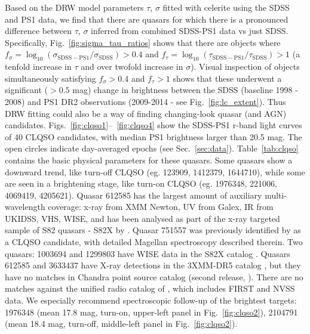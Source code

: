 \documentclass[twocolumn]{aastex62}
\newcommand{\project}[1]{\textsf{#1}}
\begin{document}
Based on the DRW model  parameters $\tau$, $\sigma$ fitted with \project{celerite} using the SDSS and PS1 data, we find that there are quasars for which there is a pronounced difference between $\tau$, $\sigma$  inferred from combined SDSS-PS1 data vs just SDSS. Specifically, Fig.~\ref{fig:sigma_tau_ratios} shows that there are objects where $f_{\sigma} = \log_{10}{\left( \sigma_{\mathrm{SDSS-PS1}} / \sigma_{\mathrm{SDSS}} \right)} > 0.4 $ and $f_{\tau} = \log_{10}{\left( \tau_{\mathrm{SDSS-PS1}} / \tau_{\mathrm{SDSS}} \right)} > 1$ (a tenfold increase in $\tau$ and over twofold increase in $\sigma$). Visual inspection of objects simultaneously satisfying $f_{\sigma}> 0.4$ and $f_{\tau}> 1 $ shows that these underwent a significant ($>0.5$ mag) change in brightness between the SDSS (baseline 1998 - 2008) and PS1 DR2 observations (2009-2014 - see Fig.~\ref{fig:lc_extent}). Thus DRW fitting could also be a way of finding changing-look quasar (and AGN) candidates. Figs.~\ref{fig:clqso1}--~\ref{fig:clqso4} show the SDSS-PS1 r-band light curves of 40 CLQSO candidates, with median PS1 brightness larger  than 20.5 mag. The open circles indicate day-averaged epochs (see Sec.~\ref{sec:data}). Table~\ref{tab:clqso} contains the basic physical parameters for these quasars. Some quasars show a downward trend, like turn-off CLQSO (eg. 123909, 1412379,  1644710), while some are seen in a brightening stage, like turn-on CLQSO (eg. 1976348, 221006, 4069419, 4205621). Quasar 612585 has the largest amount of auxiliary multi-wavelength coverage: x-ray from XMM Newton, UV from Galex, IR from UKIDSS, VHS, WISE, and has been analysed as part of the x-ray targeted sample of S82 quasars - S82X by \cite{lamassa2016a}. Quasar 751557 was previously identified by \cite{macleod2019} as a CLQSO candidate, with detailed Magellan spectroscopy described therein.  Two quasars: 1003694 and 1299803 have WISE data in the S82X catalog \citep{lamassa2016a}. Quasars 612585 and 3633437 have X-ray detections in the 3XMM-DR5 catalog \citep{rosen2016}, but they have no matches in Chandra point source catalog (second release, \citealt{evans2010, evans2018}). There are no matches against the unified radio catalog of \cite{kimball2008}, which includes FIRST and NVSS data. We especially recommend spectroscopic follow-up of the brightest targets: 1976348 (mean 17.8 mag, turn-on, upper-left panel in Fig.~\ref{fig:clqso2}), 2104791 (mean 18.4 mag, turn-off, middle-left panel in Fig.~\ref{fig:clqso2}).
\end{document}
